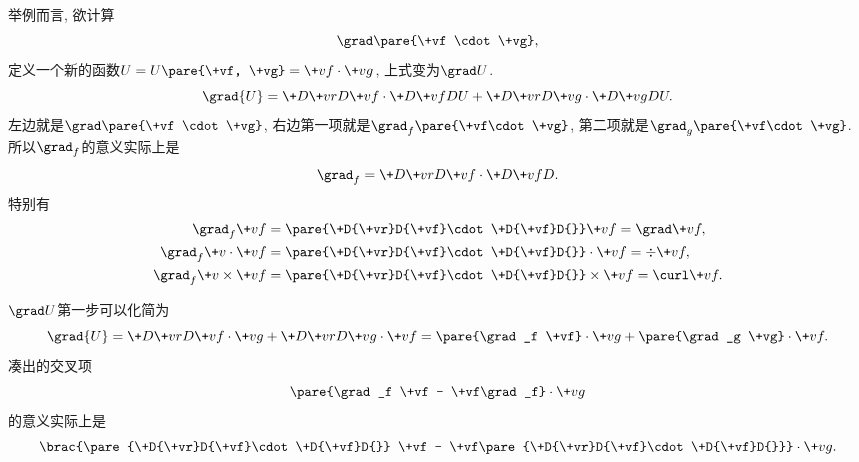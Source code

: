 \documentclass[hidelinks]{ctexart}
\begin{document}
举例而言, 欲计算
\[ \grad\pare{\+vf \cdot \+vg}, \]
定义一个新的函数$U = U\pare{\+vf, \+vg} = \+vf \cdot \+vg$, 上式变为$\grad U$.
\[ \grad{U} = \+D{\+vr}D{\+vf}\cdot \+D{\+vf}D{U} + \+D{\+vr}D{\+vg}\cdot \+D{\+vg}D{U}. \]
左边就是$\grad\pare{\+vf \cdot \+vg}$, 右边第一项就是$\grad_f \pare{\+vf\cdot \+vg}$, 第二项就是$\grad_g \pare{\+vf\cdot \+vg}$. 所以$\grad_f$的意义实际上是
\[ \grad_f = \+D{\+vr}D{\+vf}\cdot \+D{\+vf}D{}. \]
特别有
\begin{align*}
    \grad_f \+vf &= \pare{\+D{\+vr}D{\+vf}\cdot\+D{\+vf}D{}} \+vf = \grad \+vf,\\
    \grad_f \+v\cdot \+vf &= \pare{\+D{\+vr}D{\+vf}\cdot\+D{\+vf}D{}}\cdot \+vf = \div \+vf,\\
    \grad_f \+v\times \+vf &= \pare{\+D{\+vr}D{\+vf}\cdot\+D{\+vf}D{}}\times \+vf = \curl \+vf.
\end{align*}
\par
$\grad U$第一步可以化简为
\[ \grad{U} = \+D{\+vr}D{\+vf}\cdot \+vg + \+D{\+vr}D{\+vg}\cdot \+vf = \pare{\grad_f \+vf}\cdot \+vg + \pare{\grad_g \+vg} \cdot \+vf. \]
凑出的交叉项
\[ \pare{\grad_f \+vf - \+vf\grad_f}\cdot \+vg \]
的意义实际上是
\[ \brac{\pare{\+D{\+vr}D{\+vf}\cdot \+D{\+vf}D{}} \+vf - \+vf\pare{\+D{\+vr}D{\+vf}\cdot \+D{\+vf}D{}}}\cdot \+vg. \]
\end{document}
